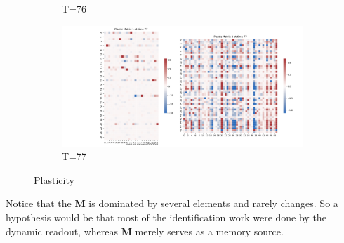 \documentclass{article}
\begin{document}
\begin{figure}[h!]
\begin{minipage}[b]{0.45\linewidth}
\begin{subfigure}[b]{\linewidth}
      \caption{T=76}
    \end{subfigure}
    \vfill
    \begin{subfigure}[b]{\linewidth}
      \includegraphics[width=\textwidth]{Plastic_combined_77}
      \caption{T=77}
    \end{subfigure}
  \end{minipage}
  \caption{Plasticity}
\end{figure}

Notice that the \textbf{M} is dominated by several elements and rarely changes. So a hypothesis would be that most of the identification work were done by the dynamic readout, whereas \textbf{M} merely serves as a memory source.


  
  
\end{document}
